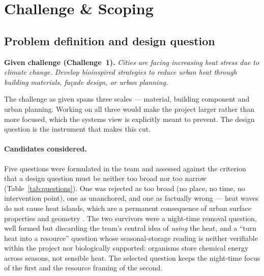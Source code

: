 %
\section{Challenge \& Scoping}

\subsection{Problem definition and design question}
\label{sec:designquestion}

\textbf{Given challenge (Challenge~1).} \emph{Cities are facing increasing heat
stress due to climate change. Develop bioinspired strategies to reduce urban
heat through building materials, façade design, or urban planning.}

The challenge as given spans three scales --- material, building component and
urban planning. Working on all three would make the project larger rather than
more focused, which the systems view is explicitly meant to prevent. The design
question is the instrument that makes this cut.

\paragraph{Candidates considered.} Five questions were formulated in the team
and assessed against the criterion that a design question must be neither too
broad nor too narrow (Table~\ref{tab:questions}). One was rejected as too broad
(no place, no time, no intervention point), one as unanchored, and one as
factually wrong --- heat waves do not cause heat islands, which are a permanent
consequence of urban surface properties and geometry \parencite{oke1982}. The
two survivors were a night-time removal question, well formed but discarding the
team's central idea of \emph{using} the heat, and a \enquote{turn heat into a
resource} question whose seasonal-storage reading is neither verifiable within
the project nor biologically supported: organisms store chemical energy across
seasons, not sensible heat. The selected question keeps the night-time focus of
the first and the resource framing of the second.

